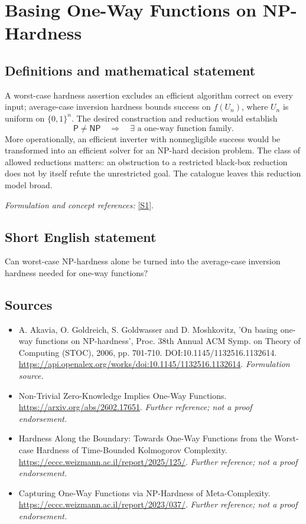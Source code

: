 \documentclass[11pt]{article}
\begin{document}
\section*{\texorpdfstring{Basing One-Way Functions on NP-Hardness}{Basing One-Way Functions on NP-Hardness}}\label{30006686}
\subsection{Definitions and mathematical statement}
A worst-case hardness assertion excludes an efficient algorithm correct on every input; average-case inversion hardness bounds success on $f(U_n)$, where $U_n$ is uniform on $\{0,1\}^n$. The desired construction and reduction would establish
\[
 \mathsf P\ne\mathsf{NP}\quad\Longrightarrow\quad
 \exists\text{ a one-way function family}.
\]
More operationally, an efficient inverter with nonnegligible success would be transformed into an efficient solver for an NP-hard decision problem. The class of allowed reductions matters: an obstruction to a restricted black-box reduction does not by itself refute the unrestricted goal. The catalogue leaves this reduction model broad.
\par\smallskip\textit{Formulation and concept references:} \href{https://api.openalex.org/works/doi:10.1145/1132516.1132614}{[S1]}.

\subsection{Short English statement}
Can worst-case NP-hardness alone be turned into the average-case inversion hardness needed for one-way functions?
\subsection{Sources}
\begin{itemize}
\item[S1]A. Akavia, O. Goldreich, S. Goldwasser and D. Moshkovitz, 'On basing one-way functions on NP-hardness', Proc. 38th Annual ACM Symp. on Theory of Computing (STOC), 2006, pp. 701-710. DOI:10.1145/1132516.1132614.
\url{https://api.openalex.org/works/doi:10.1145/1132516.1132614}.
\textit{Formulation source.}
\item[S2]Non-Trivial Zero-Knowledge Implies One-Way Functions.
\url{https://arxiv.org/abs/2602.17651}.
\textit{Further reference; not a proof endorsement.}
\item[S3]Hardness Along the Boundary: Towards One-Way Functions from the Worst-case Hardness of Time-Bounded Kolmogorov Complexity.
\url{https://eccc.weizmann.ac.il/report/2025/125/}.
\textit{Further reference; not a proof endorsement.}
\item[S4]Capturing One-Way Functions via NP-Hardness of Meta-Complexity.
\url{https://eccc.weizmann.ac.il/report/2023/037/}.
\textit{Further reference; not a proof endorsement.}
\end{itemize}
\end{document}
